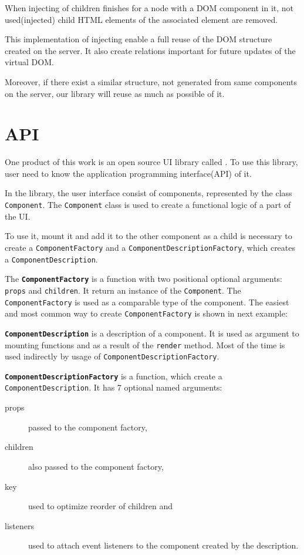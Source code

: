     When injecting of children finishes for a node with a DOM component in it, 
    not used(injected) child HTML elements of the associated element are removed.

    This implementation of injecting enable a full reuse of the DOM structure created on the server.
    It also create relations important for future updates of the virtual DOM. 

    Moreover, if there exist a similar structure, not generated from same components on the server, 
    our library will reuse as much as possible of it.

\section{API}\label{sec:our-api}

  One product of this work is an open source UI library called \tiles.
  To use this library, user need to know the application programming interface(API) of it. 

  In the \tiles library, the user interface consist of components, represented by the class \texttt{Component}. 
  The \texttt{Component} class is used to create a functional logic of a part of the UI. 

  To use it, mount it and add it to the other component as a child is necessary to create a \texttt{ComponentFactory} 
  and a \texttt{ComponentDescriptionFactory}, which creates a \texttt{ComponentDescription}.

  The \textbf{\texttt{ComponentFactory}} is a function with two positional optional arguments: \texttt{props} and \texttt{children}.
  It return an instance of the \texttt{Component}. The \texttt{ComponentFactory} is used as a comparable type of the component.
  The easiest and most common way to create \texttt{ComponentFactory} is shown in next example:
  

  \textbf{\texttt{ComponentDescription}} is a description of a component. 
  It is used as argument to mounting functions and as a result of the \texttt{render} method.
  Most of the time is used indirectly by usage of \texttt{ComponentDescriptionFactory}.

  \textbf{\texttt{ComponentDescriptionFactory}} is a function, which create a \texttt{ComponentDescription}.
  It has 7 optional named arguments: 
  \begin{description}
    \item[props] passed to the component factory,
    \item[children] also passed to the component factory, 
    \item[key] used to optimize reorder of children and
    \item[listeners] used to attach event listeners to the component created by the description.
  \end{description}

